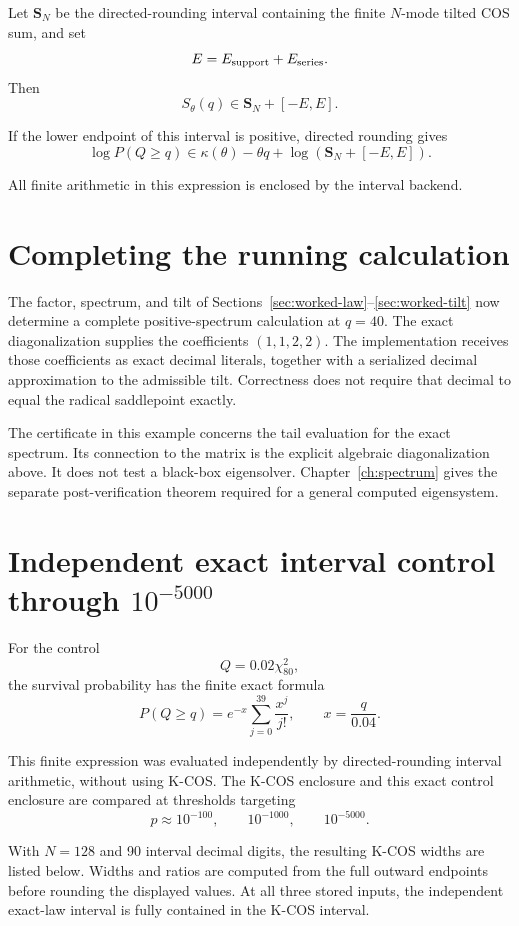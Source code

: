 Let \(\boldsymbol S_N\) be the directed-rounding interval containing the finite
\(N\)-mode tilted COS sum, and set
\[
E=E_{\rm support}+E_{\rm series}.
\]
Then
\[
\boxed{
S_\theta(q)
\in
\boldsymbol S_N+[-E,E].
}
\]

If the lower endpoint of this interval is positive, directed rounding gives
\[
\boxed{
\log P(Q\ge q)
\in
\kappa(\theta)-\theta q
+
\log\left(
\boldsymbol S_N+[-E,E]
\right).
}
\]

All finite arithmetic in this expression is enclosed by the interval backend.

\section{Completing the running calculation}\label{sec:worked-enclosure}
The factor, spectrum, and tilt of Sections~\ref{sec:worked-law}--\ref{sec:worked-tilt} now determine a complete positive-spectrum calculation at $q=40$. The exact diagonalization supplies the coefficients $(1,1,2,2)$. The implementation receives those coefficients as exact decimal literals, together with a serialized decimal approximation to the admissible tilt. Correctness does not require that decimal to equal the radical saddlepoint exactly.



The certificate in this example concerns the tail evaluation for the exact spectrum. Its connection to the matrix is the explicit algebraic diagonalization above. It does not test a black-box eigensolver. Chapter~\ref{ch:spectrum} gives the separate post-verification theorem required for a general computed eigensystem.

\section{Independent exact interval control through \texorpdfstring{\(10^{-5000}\)}{1e-5000}}

For the control
\[
Q=0.02\chi^2_{80},
\]
the survival probability has the finite exact formula
\[
P(Q\ge q)
=
e^{-x}
\sum_{j=0}^{39}
\frac{x^j}{j!},
\qquad
x=\frac{q}{0.04}.
\]

This finite expression was evaluated independently by directed-rounding
interval arithmetic, without using K-COS.  The K-COS enclosure and this exact
control enclosure are compared at thresholds targeting
\[
p\approx10^{-100},
\qquad
10^{-1000},
\qquad
10^{-5000}.
\]

With $N=128$ and 90 interval decimal digits, the resulting K-COS widths
are listed below. Widths and ratios are computed from the full outward
endpoints before rounding the displayed values. At all three stored inputs,
the independent exact-law interval is fully contained in the K-COS interval.

